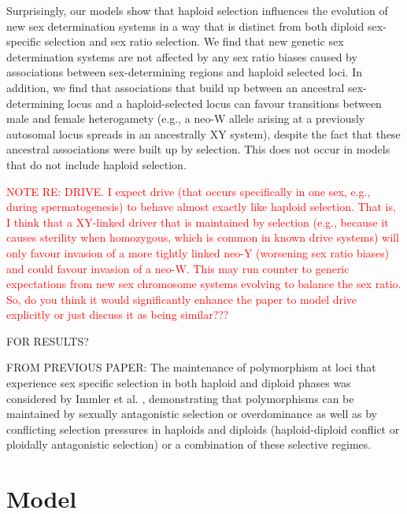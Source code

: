 \documentclass[12pt]{article}
\begin{document}
Surprisingly, our models show that haploid selection influences the evolution of new sex determination systems in a way that is distinct from both diploid sex-specific selection and sex ratio selection. 
We find that new genetic sex determination systems are not affected by any sex ratio biases caused by associations between sex-determining regions and haploid selected loci. 
In addition, we find that associations that build up between an ancestral sex-determining locus and a haploid-selected locus can favour transitions between male and female heterogamety (e.g., a neo-W allele arising at a previously autosomal locus spreads in an ancestrally XY system), despite the fact that these ancestral associations were built up by selection. 
This does not occur in models that do not include haploid selection. 



\textcolor{red}{NOTE RE: DRIVE. I expect drive (that occurs specifically in one sex, e.g., during spermatogenesis) to behave almost exactly like haploid selection. That is, I think that a XY-linked driver that is maintained by selection (e.g., because it causes sterility when homozygous, which is common in known drive systems) will only favour invasion of a more tightly linked neo-Y (worsening sex ratio biases) and could favour invasion of a neo-W. This may run counter to generic expectations from new sex chromosome systems evolving to balance the sex ratio. So, do you think it would significantly enhance the paper to model drive explicitly or just discuss it as being similar???}

{\color{blue} 
FOR RESULTS?

FROM PREVIOUS PAPER:
The maintenance of polymorphism at loci that experience sex specific selection in both haploid and diploid phases was considered by Immler et al. \cite{Immler:2012tl}, demonstrating that polymorphisms can be maintained by sexually antagonistic selection or overdominance as well as by conflicting selection pressures in haploids and diploids (haploid-diploid conflict or ploidally antagonistic selection) or a combination of these selective regimes.  
}


\section*{Model}
\end{document}
